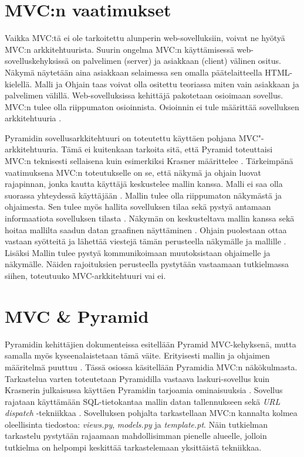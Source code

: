 \documentclass[utf8]{gradu3}
\begin{document}
\chapter{MVC:n vaatimukset}
Vaikka MVC:tä ei ole tarkoitettu alunperin web-sovelluksiin, voivat ne hyötyä MVC:n arkkitehtuurista. Suurin ongelma MVC:n käyttämisessä web-sovelluskehyksissä on palvelimen (server) ja asiakkaan (client) välinen ositus. Näkymä näytetään aina asiakkaan selaimessa sen omalla päätelaitteella HTML-kielellä. Malli ja Ohjain taas voivat olla ositettu teoriassa miten vain asiakkaan ja palvelimen välillä. Web-sovelluksissa kehittäjä pakotetaan osioimaan sovellus. MVC:n tulee olla riippumaton osioinnista. Osioinnin ei tule määrittää sovelluksen arkkitehtuuria \cite{ibm_watson}.

Pyramidin sovellusarkkitehtuuri on toteutettu käyttäen pohjana MVC"-arkkitehtuuria. Tämä ei kuitenkaan tarkoita sitä, että Pyramid toteuttaisi MVC:n teknisesti sellaisena kuin esimerkiksi Krasner määrittelee \cite{krasner_desc}. 
Tärkeimpänä vaatimuksena MVC:n toteutukselle on se, että näkymä ja ohjain luovat rajapinnan, jonka kautta käyttäjä keskustelee mallin kanssa. Malli ei saa olla suorassa yhteydessä käyttäjään \cite[s. 10]{reenskaug_tools}.
Mallin tulee olla riippumaton näkymästä ja ohjaimesta. Sen tulee myös hallita sovelluksen tilaa sekä pystyä antamaan informaatiota sovelluksen tilasta \cite{burbeck}. Näkymän on keskusteltava mallin kanssa sekä hoitaa mallilta saadun datan graafinen näyttäminen \cite[s.1]{reenskaug_orig}. Ohjain puolestaan ottaa vastaan syötteitä ja lähettää viestejä tämän perusteella näkymälle ja mallille \cite{burbeck}. Lisäksi Mallin tulee pystyä kommunikoimaan muutoksistaan ohjaimelle ja näkymälle. Näiden rajoituksien perusteella pystytään vastaamaan tutkielmassa siihen, toteutuuko MVC-arkkitehtuuri vai ei.


\chapter{MVC \& Pyramid}
Pyramidin kehittäjien dokumenteissa esitellään Pyramid MVC-kehyksenä, mutta samalla myös kyseenalaistetaan tämä väite. Erityisesti mallin ja ohjaimen määritelmä puuttuu \cite{Pyramid:intr}. Tässä
osiossa käsitellään Pyramidia MVC:n näkökulmasta. Tarkastelua varten toteutetaan Pyramidilla vastaava laskuri-sovellus kuin Krasnerin julkaisussa käyttäen Pyramidin tarjoamia ominaisuuksia \cite{krasner_desc}. Sovellus rajataan käyttämään SQL-tietokantaa mallin datan tallennukseen sekä \emph{URL dispatch} -tekniikkaa \cite{urldispatch, sql}. Sovelluksen pohjalta tarkastellaan MVC:n kannalta kolmea oleellisinta tiedostoa: \emph{views.py}, \emph{models.py} ja \emph{template.pt}. Näin tutkielman tarkastelu pystytään rajaamaan mahdollisimman pienelle alueelle, jolloin tutkielma on helpompi keskittää tarkastelemaan yksittäistä tekniikkaa.
\end{document}
